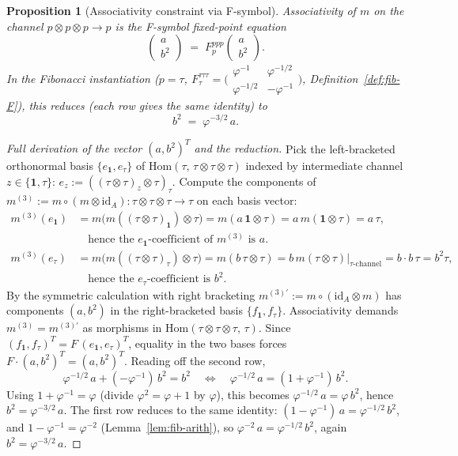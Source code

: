 \documentclass[11pt,a4paper]{article}
\newtheorem{proposition}[definition]{Proposition}
\theoremstyle{definition}
\newcommand{\Hom}{\mathrm{Hom}}
\newcommand{\id}{\mathrm{id}}
\newcommand{\one}{\mathbf{1}}
\begin{document}
\begin{proposition}[Associativity constraint via F-symbol]\label{prop:assoc-F}
Associativity of $m$ on the channel $p\otimes p\otimes p\to p$ is the
F-symbol fixed-point equation
\[
\begin{pmatrix} a \\ b^{2}\end{pmatrix}
\;=\; F^{ppp}_{p}\begin{pmatrix} a \\ b^{2}\end{pmatrix}.
\]
In the Fibonacci instantiation ($p=\tau$,
$F^{\tau\tau\tau}_\tau = \bigl(\begin{smallmatrix}\varphi^{-1}&\varphi^{-1/2}\\\varphi^{-1/2}&-\varphi^{-1}\end{smallmatrix}\bigr)$,
Definition~\ref{def:fib-F}), this reduces (each row gives the same identity) to
\[
\boxed{\; b^{2} \;=\; \varphi^{-3/2}\,a. \;}
\]
\end{proposition}

\begin{proof}[Full derivation of the vector $(a,b^{2})^{T}$ and the reduction]
Pick the left-bracketed orthonormal basis $\{e_\one, e_\tau\}$ of
$\Hom(\tau,\,\tau\otimes\tau\otimes\tau)$ indexed by intermediate channel
$z\in\{\one,\tau\}$:
$e_z := ((\tau\otimes\tau)_z\otimes\tau)_\tau$. Compute the components of
$m^{(3)} := m\circ(m\otimes\id_A): \tau\otimes\tau\otimes\tau\to\tau$ on each
basis vector:
\begin{align*}
m^{(3)}(e_\one)
&= m\bigl(m((\tau\otimes\tau)_\one)\otimes\tau\bigr)
 = m(a\,\one\otimes\tau)
 = a\,m(\one\otimes\tau) = a\,\tau, \\
&\quad\text{hence the $e_\one$-coefficient of $m^{(3)}$ is }a.\\
m^{(3)}(e_\tau)
&= m\bigl(m((\tau\otimes\tau)_\tau)\otimes\tau\bigr)
 = m(b\,\tau\otimes\tau)
 = b\,m(\tau\otimes\tau)\big|_{\tau\text{-channel}}
 = b\cdot b\,\tau = b^{2}\tau,\\
&\quad\text{hence the $e_\tau$-coefficient is }b^{2}.
\end{align*}
By the symmetric calculation with right bracketing
$m^{(3)\prime} := m\circ(\id_A\otimes m)$ has components $(a, b^{2})$ in
the right-bracketed basis $\{f_\one, f_\tau\}$. Associativity demands
$m^{(3)} = m^{(3)\prime}$ as morphisms in $\Hom(\tau\otimes\tau\otimes\tau,\,\tau)$.
Since $(f_\one, f_\tau)^{T} = F\,(e_\one, e_\tau)^{T}$, equality in the two
bases forces
$F\cdot(a, b^{2})^{T} = (a, b^{2})^{T}$. Reading off the second row,
\[
\varphi^{-1/2}\,a + (-\varphi^{-1})\,b^{2} = b^{2}
\quad\Longleftrightarrow\quad
\varphi^{-1/2}\,a = (1+\varphi^{-1})\,b^{2}.
\]
Using $1+\varphi^{-1} = \varphi$ (divide $\varphi^{2}=\varphi+1$ by
$\varphi$), this becomes $\varphi^{-1/2}\,a = \varphi\,b^{2}$, hence
$b^{2} = \varphi^{-3/2}\,a$. The first row reduces to the same identity:
$(1-\varphi^{-1})\,a = \varphi^{-1/2}\,b^{2}$, and
$1-\varphi^{-1} = \varphi^{-2}$ (Lemma~\ref{lem:fib-arith}), so
$\varphi^{-2}\,a = \varphi^{-1/2}\,b^{2}$, again $b^{2} = \varphi^{-3/2}\,a$.
\end{proof}
\end{document}
